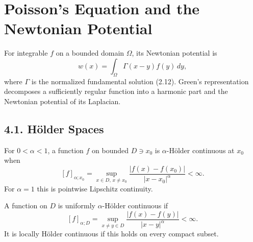 \chapter{Poisson's Equation and the Newtonian Potential}

For integrable $f$ on a bounded domain $\Omega$, its Newtonian potential is
\[
w(x)=\int_\Omega\Gamma(x-y)f(y)\,dy,
\]
where $\Gamma$ is the normalized fundamental solution (2.12). Green's
representation decomposes a sufficiently regular function into a harmonic
part and the Newtonian potential of its Laplacian.

\section*{4.1. H\"older Spaces}

\begin{definition}\label{gt:def-holder-pointwise}
For $0<\alpha<1$, a function $f$ on bounded $D\ni x_0$ is
$\alpha$-H\"older continuous at $x_0$ when
\begin{equation}
\tag{4.3}
[f]_{\alpha;x_0}=\sup_{x\in D,\,x\neq x_0}
\frac{|f(x)-f(x_0)|}{|x-x_0|^\alpha}<\infty.
\end{equation}
For $\alpha=1$ this is pointwise Lipschitz continuity.
\end{definition}

\begin{definition}\label{gt:def-holder-uniform-local}
A function on $D$ is uniformly $\alpha$-H\"older continuous if
\begin{equation}
\tag{4.4}
[f]_{\alpha;D}=\sup_{x\neq y\in D}
\frac{|f(x)-f(y)|}{|x-y|^\alpha}<\infty.
\end{equation}
It is locally H\"older continuous if this holds on every compact subset.
\end{definition}

